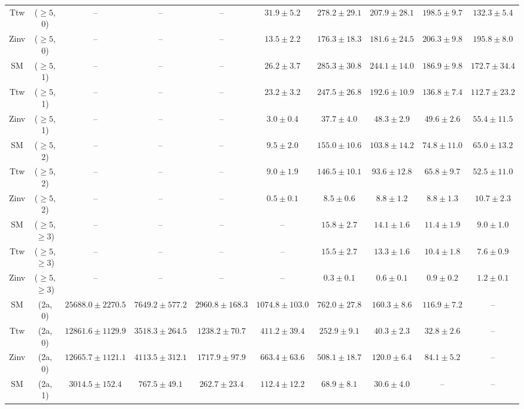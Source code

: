 \begin{table}[h!]
{\begin{tabular}{cccccccccc}
	Ttw & ($\ge5$, 0) & -- & -- & -- & $31.9\pm 5.2$ & $278.2\pm 29.1$ & $207.9\pm 28.1$ & $198.5\pm 9.7$ & $132.3\pm 5.4$ \\[0.5ex] 
	Zinv & ($\ge5$, 0) & -- & -- & -- & $13.5\pm 2.2$ & $176.3\pm 18.3$ & $181.6\pm 24.5$ & $206.3\pm 9.8$ & $195.8\pm 8.0$ \\[0.5ex] 
	SM & ($\ge5$, 1) & -- & -- & -- & $26.2\pm 3.7$ & $285.3\pm 30.8$ & $244.1\pm 14.0$ & $186.9\pm 9.8$ & $172.7\pm 34.4$ \\[0.5ex] 
	Ttw & ($\ge5$, 1) & -- & -- & -- & $23.2\pm 3.2$ & $247.5\pm 26.8$ & $192.6\pm 10.9$ & $136.8\pm 7.4$ & $112.7\pm 23.2$ \\[0.5ex] 
	Zinv & ($\ge5$, 1) & -- & -- & -- & $3.0\pm 0.4$ & $37.7\pm 4.0$ & $48.3\pm 2.9$ & $49.6\pm 2.6$ & $55.4\pm 11.5$ \\[0.5ex] 
	SM & ($\ge5$, 2) & -- & -- & -- & $9.5\pm 2.0$ & $155.0\pm 10.6$ & $103.8\pm 14.2$ & $74.8\pm 11.0$ & $65.0\pm 13.2$ \\[0.5ex] 
	Ttw & ($\ge5$, 2) & -- & -- & -- & $9.0\pm 1.9$ & $146.5\pm 10.1$ & $93.6\pm 12.8$ & $65.8\pm 9.7$ & $52.5\pm 11.0$ \\[0.5ex] 
	Zinv & ($\ge5$, 2) & -- & -- & -- & $0.5\pm 0.1$ & $8.5\pm 0.6$ & $8.8\pm 1.2$ & $8.8\pm 1.3$ & $10.7\pm 2.3$ \\[0.5ex] 
	SM & ($\ge5$, $\ge3$) & -- & -- & -- & -- & $15.8\pm 2.7$ & $14.1\pm 1.6$ & $11.4\pm 1.9$ & $9.0\pm 1.0$ \\[0.5ex] 
	Ttw & ($\ge5$, $\ge3$) & -- & -- & -- & -- & $15.5\pm 2.7$ & $13.3\pm 1.6$ & $10.4\pm 1.8$ & $7.6\pm 0.9$ \\[0.5ex] 
	Zinv & ($\ge5$, $\ge3$) & -- & -- & -- & -- & $0.3\pm 0.1$ & $0.6\pm 0.1$ & $0.9\pm 0.2$ & $1.2\pm 0.1$ \\[0.5ex] 
	SM & (2a, 0) & $25688.0\pm 2270.5$ & $7649.2\pm 577.2$ & $2960.8\pm 168.3$ & $1074.8\pm 103.0$ & $762.0\pm 27.8$ & $160.3\pm 8.6$ & $116.9\pm 7.2$ & -- \\[0.5ex] 
	Ttw & (2a, 0) & $12861.6\pm 1129.9$ & $3518.3\pm 264.5$ & $1238.2\pm 70.7$ & $411.2\pm 39.4$ & $252.9\pm 9.1$ & $40.3\pm 2.3$ & $32.8\pm 2.6$ & -- \\[0.5ex] 
	Zinv & (2a, 0) & $12665.7\pm 1121.1$ & $4113.5\pm 312.1$ & $1717.9\pm 97.9$ & $663.4\pm 63.6$ & $508.1\pm 18.7$ & $120.0\pm 6.4$ & $84.1\pm 5.2$ & -- \\[0.5ex] 
	SM & (2a, 1) & $3014.5\pm 152.4$ & $767.5\pm 49.1$ & $262.7\pm 23.4$ & $112.4\pm 12.2$ & $68.9\pm 8.1$ & $30.6\pm 4.0$ & -- & -- \\[0.5ex] 

\end{tabular}}
\end{table}
